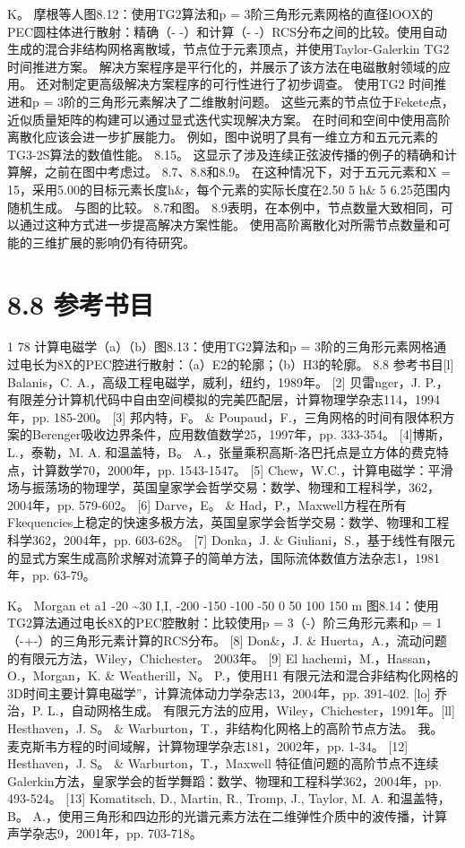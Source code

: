 \documentclass[UTF8,11pt,a4paper,openany,fontset=fandol]{ctexbook}
\begin{document}
K。 摩根等人图8.12：使用TG2算法和p = 3阶三角形元素网格的直径lOOX的PEC圆柱体进行散射：精确（- -）和计算（- -）RCS分布之间的比较。使用自动生成的混合非结构网格离散域，节点位于元素顶点，并使用Taylor-Galerkin TG2 时间推进方案。 解决方案程序是平行化的，并展示了该方法在电磁散射领域的应用。 还对制定更高级解决方案程序的可行性进行了初步调查。 使用TG2 时间推进和p = 3阶的三角形元素解决了二维散射问题。 这些元素的节点位于Fekete点，近似质量矩阵的构建可以通过显式迭代实现解决方案。 在时间和空间中使用高阶离散化应该会进一步扩展能力。 例如，图中说明了具有一维立方和五元元素的TG3-2S算法的数值性能。 8.15。 这显示了涉及连续正弦波传播的例子的精确和计算解，之前在图中考虑过。 8.7、8.8和8.9。 在这种情况下，对于五元元素和X = 15，采用5.00的目标元素长度h\&，每个元素的实际长度在2.50 5 h\& 5 6.25范围内随机生成。 与图的比较。 8.7和图。 8.9表明，在本例中，节点数量大致相同，可以通过这种方式进一步提高解决方案性能。 使用高阶离散化对所需节点数量和可能的三维扩展的影响仍有待研究。

\section{8.8 参考书目}
1 78 计算电磁学（a）（b）图8.13：使用TG2算法和p = 3阶的三角形元素网格通过电长为8X的PEC腔进行散射：（a）E2的轮廓；（b）H3的轮廓。 8.8 参考书目[l] Balanis，C. A.，高级工程电磁学，威利，纽约，1989年。 [2] 贝雷nger，J. P.，有限差分计算机代码中自由空间模拟的完美匹配层，计算物理学杂志114，1994年，pp. 185-200。 [3] 邦内特，F。 \& Poupaud，F.，三角网格的时间有限体积方案的Berenger吸收边界条件，应用数值数学25，1997年，pp. 333-354。 [4]博斯，L.，泰勒，M. A. 和温盖特，B。 A.，张量乘积高斯-洛巴托点是立方体的费克特点，计算数学70，2000年，pp. 1543-1547。 [5] Chew，W.C.，计算电磁学：平滑场与振荡场的物理学，英国皇家学会哲学交易：数学、物理和工程科学，362，2004年，pp. 579-602。 [6] Darve，E。 \& Had，P.，Maxwell方程在所有Fkequencies上稳定的快速多极方法，英国皇家学会哲学交易：数学、物理和工程科学362，2004年，pp. 603-628。 [7] Donka，J. \& Giuliani，S.，基于线性有限元的显式方案生成高阶求解对流算子的简单方法，国际流体数值方法杂志1，1981年，pp. 63-79。

K。 Morgan et a1 -20 \textasciitilde{}30 I,I, -200 -150 -100 -50 0 50 100 150 m 图8.14：使用TG2算法通过电长8X的PEC腔散射：比较使用p = 3（-）阶三角形元素和p = 1（-+-）的三角形元素计算的RCS分布。 [8] Don\&，J. \& Huerta，A.，流动问题的有限元方法，Wiley，Chichester。 2003年。 [9] El hachemi，M.，Hassan，O.，Morgan，K. \& Weatherill，N。 P.，使用H1 有限元法和混合非结构化网格的3D时间主要计算电磁学”，计算流体动力学杂志13，2004年，pp. 391-402. [lo] 乔治，P. L.，自动网格生成。 有限元方法的应用，Wiley，Chichester，1991年。[ll] Hesthaven，J. S。 \& Warburton，T.，非结构化网格上的高阶节点方法。 我。 麦克斯韦方程的时间域解，计算物理学杂志181，2002年，pp. 1-34。 [12] Hesthaven，J. S。 \& Warburton，T.，Maxwell 特征值问题的高阶节点不连续Galerkin方法，皇家学会的哲学舞蹈：数学、物理和工程科学362，2004年，pp. 493-524。 [13] Komatitsch, D., Martin, R., Tromp, J., Taylor, M. A. 和温盖特，B。 A.，使用三角形和四边形的光谱元素方法在二维弹性介质中的波传播，计算声学杂志9，2001年，pp. 703-718。
\end{document}
